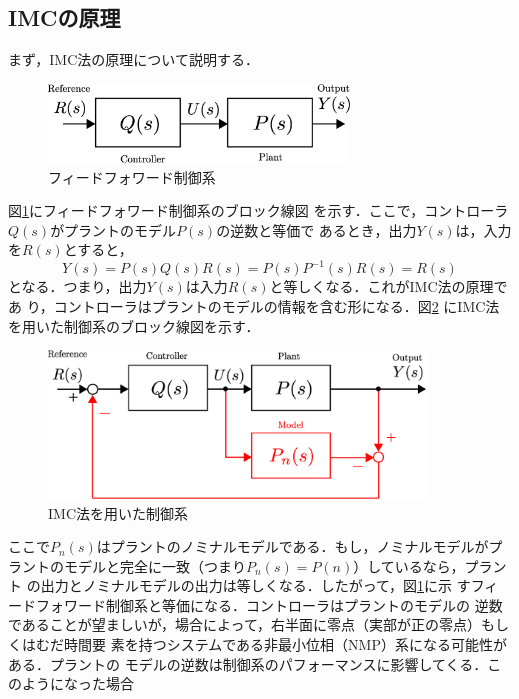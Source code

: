 \documentclass[a4paper,12pt]{jarticle}
\begin{document}
\subsection{IMCの原理}
まず，IMC法の原理について説明する．
%
\begin{figure}[tbp]
 \begin{center}
  \includegraphics[width = 80mm]{fig/FF.eps}
 \end{center}
 \caption{フィードフォワード制御系}
 \label{fig:ff}
\end{figure}
%
図\ref{fig:ff}にフィードフォワード制御系のブロック線図
を示す．ここで，コントローラ$Q(s)$がプラントのモデル$P(s)$の逆数と等価で
あるとき，出力$Y(s)$は，入力を$R(s)$とすると，
\begin{equation}
Y(s) = P(s)Q(s)R(s) = P(s)P^{-1}(s)R(s) =R(s)
\end{equation}
となる．つまり，出力$Y(s)$は入力$R(s)$と等しくなる．これがIMC法の原理であ
り，コントローラはプラントのモデルの情報を含む形になる．図\ref{fig:IMC}
にIMC法を用いた制御系のブロック線図を示す．
%
\begin{figure}[tbp]
 \begin{center}
  \includegraphics[width = 100mm]{fig/IMC.eps}
 \end{center}
 \caption{IMC法を用いた制御系}
 \label{fig:IMC}
\end{figure}
%
ここで$P_n(s)$はプラントのノミナルモデルである．もし，ノミナルモデルがプ
ラントのモデルと完全に一致（つまり$P_n(s)=P(n)$）しているなら，プラント
の出力とノミナルモデルの出力は等しくなる．したがって，図\ref{fig:ff}に示
すフィードフォワード制御系と等価になる．コントローラはプラントのモデルの
逆数であることが望ましいが，場合によって，右半面に零点（実部が正の零点）もしくはむだ時間要
素を持つシステムである非最小位相（NMP）系になる可能性がある．プラントの
モデルの逆数は制御系のパフォーマンスに影響してくる．このようになった場合
\end{document}
